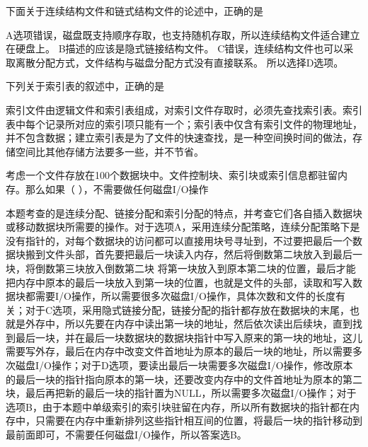 \question 下面关于连续结构文件和链式结构文件的论述中，正确的是
\par{}
\begin{solution}A选项错误，磁盘既支持顺序存取，也支持随机存取，所以连续结构文件适合建立在硬盘上。
B描述的应该是隐式链接结构文件。
C错误，连续结构文件也可以采取离散分配方式，文件结构与磁盘分配方式没有直接联系。
所以选择D选项。
\end{solution}
\question 下列关于索引表的叙述中，正确的是
\par{}
\begin{solution}索引文件由逻辑文件和索引表组成，对索引文件存取时，必须先查找索引表。索引表中每个记录所对应的索引项只能有一个；索引表中仅含有索引文件的物理地址，并不包含数据；建立索引表是为了文件的快速查找，是一种空间换时间的做法，存储空间比其他存储方法要多一些，并不节省。
\end{solution}
\question 考虑一个文件存放在100个数据块中。文件控制块、索引块或索引信息都驻留内存。那么如果（
），不需要做任何磁盘I/O操作
\par{}
\begin{solution}本题考查的是连续分配、链接分配和索引分配的特点，并考查它们各自插入数据块或移动数据块所需要的操作。对于选项A，采用连续分配策略，连续分配策略下是没有指针的，对每个数据块的访问都可以直接用块号寻址到，不过要把最后一个数据块搬到文件头部，首先要把最后一块读入内存，然后将倒数第二块放入到最后一块，将倒数第三块放入倒数第二块
将第一块放入到原本第二块的位置，最后才能把内存中原本的最后一块放入到第一块的位置，也就是文件的头部，读取和写入数据块都需要I/O操作，所以需要很多次磁盘I/O操作，具体次数和文件的长度有关；对于C选项，采用隐式链接分配，链接分配的指针都存放在数据块的末尾，也就是外存中，所以先要在内存中读出第一块的地址，然后依次读出后续块，直到找到最后一块，并在最后一块数据块的数据块指针中写入原来的第一块的地址，这儿需要写外存，最后在内存中改变文件首地址为原本的最后一块的地址，所以需要多次磁盘I/O操作；对于D选项，要读出最后一块需要多次磁盘I/O操作，修改原本的最后一块的指针指向原本的第一块，还要改变内存中的文件首地址为原本的第二块，最后再把新的最后一块的指针置为NULL，所以需要多次磁盘I/O操作；对于选项B，由于本题中单级索引的索引块驻留在内存，所以所有数据块的指针都在内存中，只需要在内存中重新排列这些指针相互间的位置，将最后一块的指针移动到最前面即可，不需要任何磁盘I/O操作，所以答案选B。
\end{solution}
